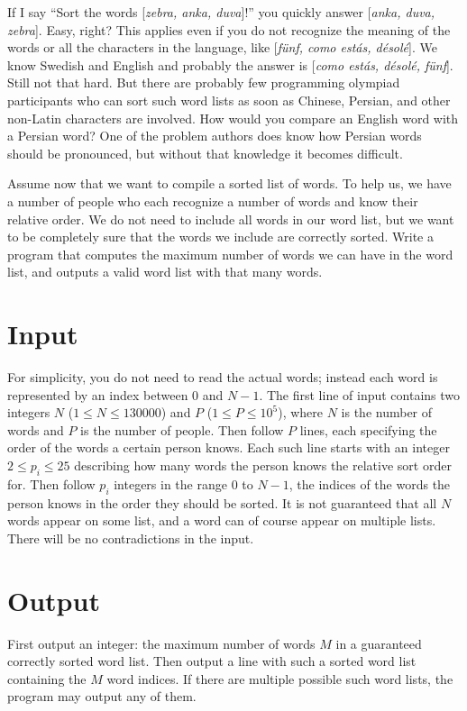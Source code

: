 
If I say ``Sort the words [\emph{zebra, anka, duva}]!'' you quickly answer [\emph{anka, duva, zebra}]. Easy, right? This applies even if you do not recognize the meaning of the words or all the characters in the language, like [\emph{fünf, como estás, désolé}]. We know Swedish and English and probably the answer is [\emph{como estás, désolé, fünf}]. Still not that hard. But there are probably few programming olympiad participants who can sort such word lists as soon as Chinese, Persian, and other non-Latin characters are involved. How would you compare an English word with a Persian word? One of the problem authors does know how Persian words should be pronounced, but without that knowledge it becomes difficult.


Assume now that we want to compile a sorted list of words. To help us, we have a number of people who each recognize a number of words and know their relative order. We do not need to include all words in our word list, but we want to be completely sure that the words we include are correctly sorted. Write a program that computes the maximum number of words we can have in the word list, and outputs a valid word list with that many words.

\section*{Input}
For simplicity, you do not need to read the actual words; instead each word is represented by an index between $0$ and $N-1$. The first line of input contains two integers $N$ ($1 \leq N \leq 130000$) and $P$ ($1 \leq P \leq 10^5$), where $N$ is the number of words and $P$ is the number of people. Then follow $P$ lines, each specifying the order of the words a certain person knows. Each such line starts with an integer $2 \leq p_i \leq 25$ describing how many words the person knows the relative sort order for. Then follow $p_i$ integers in the range $0$ to $N-1$, the indices of the words the person knows in the order they should be sorted. It is not guaranteed that all $N$ words appear on some list, and a word can of course appear on multiple lists. There will be no contradictions in the input.


\section*{Output}
First output an integer: the maximum number of words $M$ in a guaranteed correctly sorted word list. Then output
a line with such a sorted word list containing the $M$ word indices. If there are multiple possible such
word lists, the program may output any of them.


